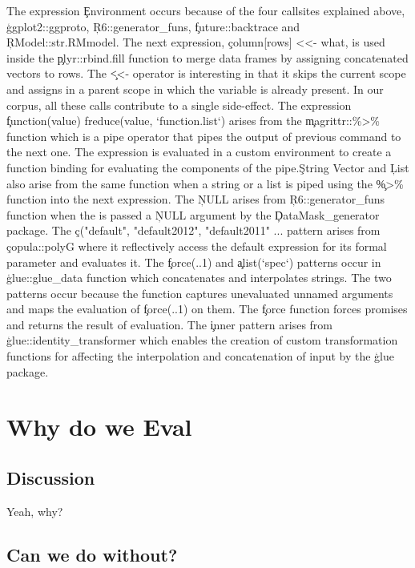\documentclass[screen,acmsmall]{acmart}
\begin{document}
The expression \c{Environment} occurs because of the four callsites explained
above, \c{ggplot2::ggproto}, \c{R6::generator\_funs}, \c{future::backtrace} and
\c{RModel::str.RMmodel}. The next expression, \c{column[rows] <<- what}, is used
inside the \c{plyr::rbind.fill} function to merge data frames by assigning
concatenated vectors to rows. The \c{<<-} operator is interesting in that it
skips the current scope and assigns in a parent scope in which the variable is
already present. In our corpus, all these \eval calls contribute to a single
side-effect. The expression \c{function(value) freduce(value, `function.list`)}
arises from the \c{magrittr::\%>\%} function which is a pipe operator that pipes
the output of previous command to the next one. The expression is evaluated in a
custom environment to create a function binding for evaluating the components of
the pipe.\c{String Vector} and \c{List} also arise from the same function when a
string or a list is piped using the \c{\%>\%} function into the next expression.
The \c{NULL} arises from \c{R6::generator\_funs} function when the \eval is
passed a \c{NULL} argument by the \c{DataMask\_generator} package. The
\c{c("default", "default2012", "default2011" ...} pattern arises from
\c{copula::polyG} where it reflectively access the default expression for its
formal parameter and evaluates it. The \c{force(..1)} and \c{alist(`spec`)}
patterns occur in \c{glue::glue\_data} function which concatenates and
interpolates strings. The two patterns occur because the function captures
unevaluated unnamed arguments and maps the evaluation of \c{force(..1)} on them.
The \c{force} function forces promises and returns the result of evaluation. The
\c{inner} pattern arises from \c{glue::identity\_transformer} which enables the
creation of custom transformation functions for affecting the interpolation and
concatenation of input by the \c{glue} package.


\section{Why do we Eval}

\subsection{Discussion}

Yeah, why?

\subsection{Can we do without?}
\end{document}
